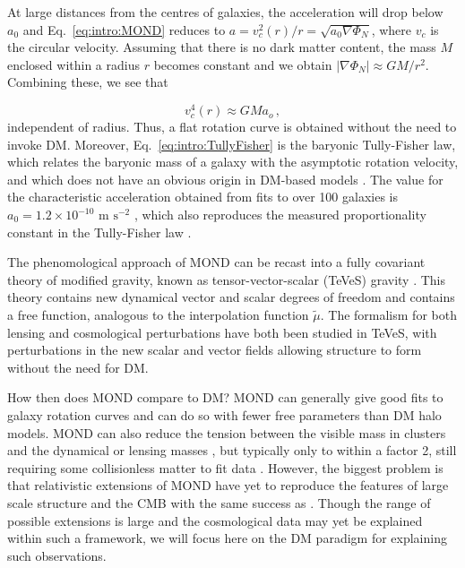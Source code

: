 At large distances from the centres of galaxies, the acceleration will drop below $a_0$ and Eq.~\ref{eq:intro:MOND} reduces to $a = v_c^2(r)/r = \sqrt{a_0 \nabla \Phi_N}$, where $v_c$ is the circular velocity. Assuming that there is no dark matter content, the mass $M$ enclosed within a radius $r$ becomes constant and we obtain $|\nabla \Phi_N| \approx GM/r^2$. Combining these, we see that

\begin{equation}
\label{eq:intro:TullyFisher}
v_c^4(r) \approx GM a_o\,,
\end{equation}
independent of radius. Thus, a flat rotation curve is obtained without the need to invoke DM. Moreover, Eq.~\ref{eq:intro:TullyFisher} is the baryonic Tully-Fisher law, which relates the baryonic mass of a galaxy with the asymptotic rotation velocity, and which does not have an obvious origin in DM-based models \cite{Gnedin:2007}. The value for the characteristic acceleration obtained from fits to over 100 galaxies is $a_0 = 1.2 \times 10^{-10} \textrm{ m s}^{-2}$ \cite{Begeman:1991}, which also reproduces the measured proportionality constant in the Tully-Fisher law \cite{McGaugh:2005}.

The phenomological approach of MOND can be recast into a fully covariant theory of modified gravity, known as tensor-vector-scalar (TeVeS) gravity \cite{Bekenstein:2005}. This theory contains new dynamical vector and scalar degrees of freedom and contains a free function, analogous to the interpolation function $\tilde{\mu}$. The formalism for both lensing \cite{Chiu:2005} and cosmological perturbations \cite{Skordis:2006} have both been studied in TeVeS, with perturbations in the new scalar and vector fields allowing structure to form without the need for DM.

How then does MOND compare to DM? MOND can generally give good fits to galaxy rotation curves \cite{Begeman:1991,Sanders:1996,deBlok:1998} and can do so with fewer free parameters than DM halo models. MOND can also reduce the tension between the visible mass in clusters and the dynamical or lensing masses \cite{Sanders:2002,Angus:2006}, but typically only to within a factor 2, still requiring some collisionless matter to fit data \cite{Dodelson:2006}. However, the biggest problem is that relativistic extensions of MOND have yet to reproduce the features of large scale structure and the CMB with the same success as \LCDM \cite{Slosar:2005,Skordis:2006b,Zuntz:2010}. Though the range of possible extensions is large and the cosmological data may yet be explained within such a framework, we will focus here on the DM paradigm for explaining such observations.


